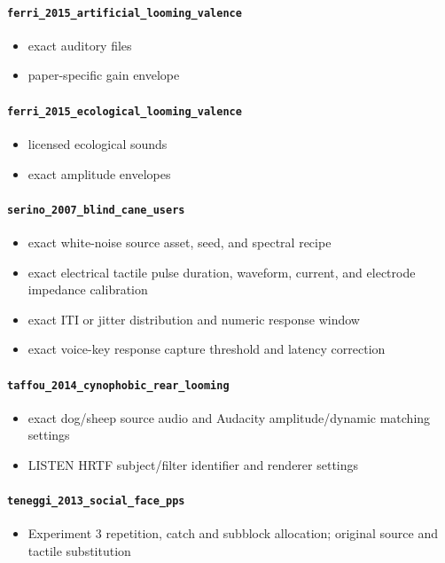 \documentclass[11pt]{article}
\begin{document}
\paragraph{\texttt{ferri\_\allowbreak{}2015\_\allowbreak{}artificial\_\allowbreak{}looming\_\allowbreak{}valence}}
\begin{itemize}
\item exact auditory files
\item paper-specific gain envelope
\end{itemize}
\paragraph{\texttt{ferri\_\allowbreak{}2015\_\allowbreak{}ecological\_\allowbreak{}looming\_\allowbreak{}valence}}
\begin{itemize}
\item licensed ecological sounds
\item exact amplitude envelopes
\end{itemize}
\paragraph{\texttt{serino\_\allowbreak{}2007\_\allowbreak{}blind\_\allowbreak{}cane\_\allowbreak{}users}}
\begin{itemize}
\item exact white-noise source asset, seed, and spectral recipe
\item exact electrical tactile pulse duration, waveform, current, and electrode impedance calibration
\item exact ITI or jitter distribution and numeric response window
\item exact voice-key response capture threshold and latency correction
\end{itemize}
\paragraph{\texttt{taffou\_\allowbreak{}2014\_\allowbreak{}cynophobic\_\allowbreak{}rear\_\allowbreak{}looming}}
\begin{itemize}
\item exact dog/sheep source audio and Audacity amplitude/dynamic matching settings
\item LISTEN HRTF subject/filter identifier and renderer settings
\end{itemize}
\paragraph{\texttt{teneggi\_\allowbreak{}2013\_\allowbreak{}social\_\allowbreak{}face\_\allowbreak{}pps}}
\begin{itemize}
\item Experiment 3 repetition, catch and subblock allocation; original source and tactile substitution
\end{itemize}
\end{document}

